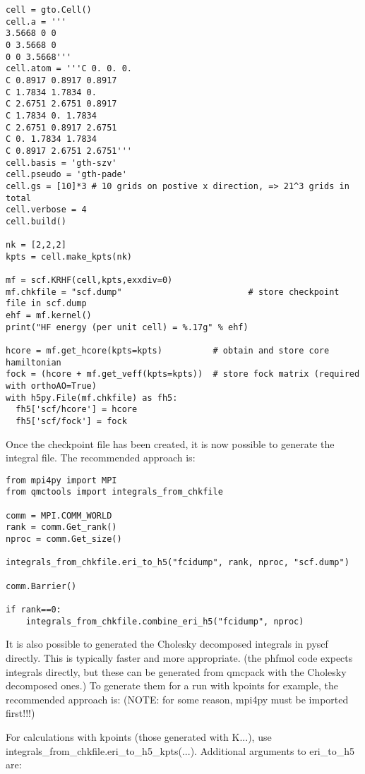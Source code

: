 \begin{itemize}
\begin{lstlisting}[caption=The following is an example PYSCF input file for calculations with k-points.]
cell = gto.Cell()
cell.a = '''
3.5668 0 0
0 3.5668 0
0 0 3.5668'''
cell.atom = '''C 0. 0. 0. 
C 0.8917 0.8917 0.8917
C 1.7834 1.7834 0. 
C 2.6751 2.6751 0.8917
C 1.7834 0. 1.7834
C 2.6751 0.8917 2.6751
C 0. 1.7834 1.7834
C 0.8917 2.6751 2.6751'''
cell.basis = 'gth-szv'
cell.pseudo = 'gth-pade'
cell.gs = [10]*3 # 10 grids on postive x direction, => 21^3 grids in total
cell.verbose = 4
cell.build()

nk = [2,2,2]
kpts = cell.make_kpts(nk) 

mf = scf.KRHF(cell,kpts,exxdiv=0)
mf.chkfile = "scf.dump"                         # store checkpoint file in scf.dump
ehf = mf.kernel()
print("HF energy (per unit cell) = %.17g" % ehf)

hcore = mf.get_hcore(kpts=kpts)          # obtain and store core hamiltonian
fock = (hcore + mf.get_veff(kpts=kpts))  # store fock matrix (required with orthoAO=True)
with h5py.File(mf.chkfile) as fh5:
  fh5['scf/hcore'] = hcore
  fh5['scf/fock'] = fock
\end{lstlisting}
\end{itemize}

Once the checkpoint file has been created, it is now possible to generate the integral file. The recommended approach is:

\begin{lstlisting}[caption=The following is an example input file for calculating the integrals.]
from mpi4py import MPI
from qmctools import integrals_from_chkfile

comm = MPI.COMM_WORLD
rank = comm.Get_rank()
nproc = comm.Get_size()

integrals_from_chkfile.eri_to_h5("fcidump", rank, nproc, "scf.dump")    

comm.Barrier()

if rank==0:
    integrals_from_chkfile.combine_eri_h5("fcidump", nproc)
\end{lstlisting}

It is also possible to generated the Cholesky decomposed integrals in pyscf directly. This is typically faster and more appropriate. (the phfmol code expects integrals directly, but these can be generated from qmcpack with the Cholesky decomposed ones.) To generate them for a run with kpoints for example, the recommended approach is: (NOTE: for some reason, mpi4py must be imported first!!!)

For calculations with kpoints (those generated with K...), use integrals\_from\_chkfile.eri\_to\_h5\_kpts(...).
Additional arguments to eri\_to\_h5 are:

